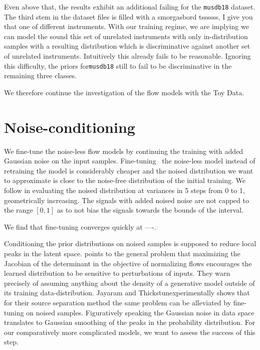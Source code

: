Even above that, the results exhibit an additional failing for the \texttt{musdb18} dataset. The third stem in the dataset files  is filled with a smorgasbord {\color{red}tssssss, I give you that one} of different instruments. With our training regime, we are implying we can model the sound this set of unrelated instruments with only in-distribution samples with a resulting distribution which is discriminative against another set of unrelated instruments. Intuitively this already fails to be reasonable. Ignoring this difficulty, the priors for\texttt{musdb18} still to fail to be discriminative in the remaining three classes.

We therefore continue the investigation of the flow models with the Toy Data.

\section{Noise-conditioning}
We fine-tune the noise-less flow models by continuing the training with added Gaussian noise on the input samples. Fine-tuning~\cite{yosinskiHow2014} the noise-less model instead of retraining the model is considerably cheaper and the noised distribution we want to approximate is close to the noise-free distribution of the initial training. We follow \textcite{jayaramSource2020} in evaluating the noised distribution at variances in 5 steps from 0 to 1, geometrically increasing. The signals with added noised {\color{red}noise} are not capped to the range \([0,1]\) as to not bias the signals towards the bounds of the interval.

We find that fine-tuning converges quickly at ----.

Conditioning the prior distributions on noised samples is supposed to reduce local peaks in the latent space. \textcite{nalisnickDeep2019} points to the general problem that maximizing the Jacobian of the determinant in the objective of normalizing flows encourages the learned distribution to be sensitive to perturbations of inputs. They warn precisely of assuming anything about the density of a generative model outside of its training data-distribution. Jayaram and Thickstun experimentally shows that for their source separation method the same problem can be alleviated by fine-tuning on noised samples. Figuratively speaking the Gaussian noise in data space translates to Gaussian smoothing of the peaks in the probability distribution. For our comparatively more complicated models, we want to assess the success of this step.

